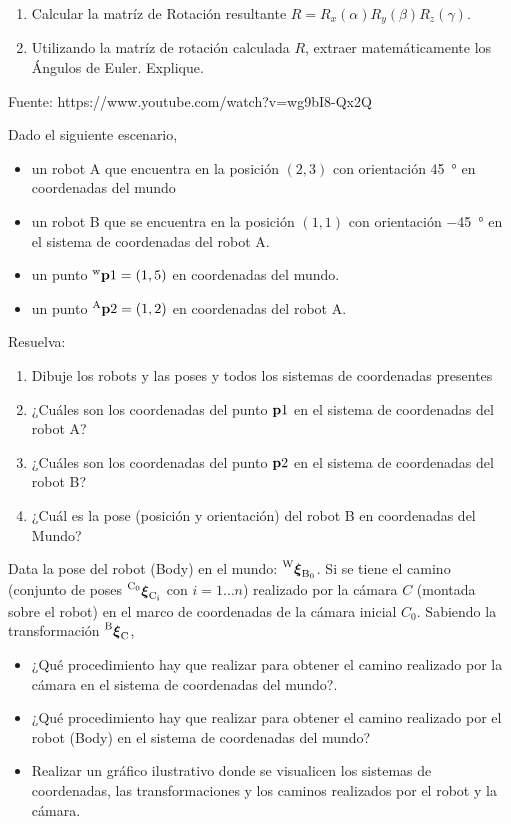 \documentclass[tp]{lcc}
\begin{document}
\begin{enumerate}
    \item Calcular la matríz de Rotación resultante $R = R_{x}(\alpha) R_{y}(\beta) R_{z}(\gamma)$.
    \item Utilizando la matríz de rotación calculada $R$, extraer matemáticamente los Ángulos de Euler. Explique.
\end{enumerate}

\begin{solucion}
    Fuente: https://www.youtube.com/watch?v=wg9bI8-Qx2Q
\end{solucion}


\ejercicio Dado el siguiente escenario,
\begin{itemize}
    \item un robot A que encuentra en la posición $(2,3)$ con orientación \SI{45}{\degree} en coordenadas del mundo
    \item un robot B que se encuentra en la posición $(1,1)$ con orientación \SI{-45}{\degree} en el sistema de coordenadas del robot A.
    \item un punto $\prescript{\mathrm{\mathrm{w}}}{}{\boldsymbol{\mathbf{p}}}1 = (1,5)$ en coordenadas del mundo.
    \item un punto $\prescript{\mathrm{A}}{}{\boldsymbol{\mathbf{p}}}2 = (1,2)$ en coordenadas del robot A.
\end{itemize}
Resuelva:
\begin{enumerate}
    \item Dibuje los robots y las poses y todos los sistemas de coordenadas presentes
    \item ¿Cuáles son los coordenadas del punto $\boldsymbol{\mathbf{p}}1$ en el sistema de coordenadas del robot A?
    \item ¿Cuáles son los coordenadas del punto $\boldsymbol{\mathbf{p}}2$ en el sistema de coordenadas del robot B?
    \item ¿Cuál es la pose (posición y orientación) del robot B en coordenadas del Mundo?
\end{enumerate}

\ejercicio Data la pose del robot (Body) en el mundo: $\prescript{\mathrm{W}}{}{{\boldsymbol{\mathbf{\xi}}}_\mathrm{B_{0}}}$. Si se tiene el camino (conjunto de poses $\prescript{\mathrm{C_{0}}}{}{{\boldsymbol{\mathbf{\xi}}}_\mathrm{C_{i}}}$ con $i = 1 \dots n$) realizado por la cámara $C$ (montada sobre el robot) en el marco de coordenadas de la cámara inicial $C_{0}$. Sabiendo la transformación $\prescript{\mathrm{B}}{}{{\boldsymbol{\mathbf{\xi}}}_\mathrm{C}}$, 
\begin{itemize}
	\item ¿Qué procedimiento hay que realizar para obtener el camino realizado por la cámara en el sistema de coordenadas del mundo?.
	\item ¿Qué procedimiento hay que realizar para obtener el camino realizado por el robot (Body) en el sistema de coordenadas del mundo?
    \item Realizar un gráfico ilustrativo donde se visualicen los sistemas de coordenadas, las transformaciones y los caminos realizados por el robot y la cámara.
\end{itemize}
\end{document}
